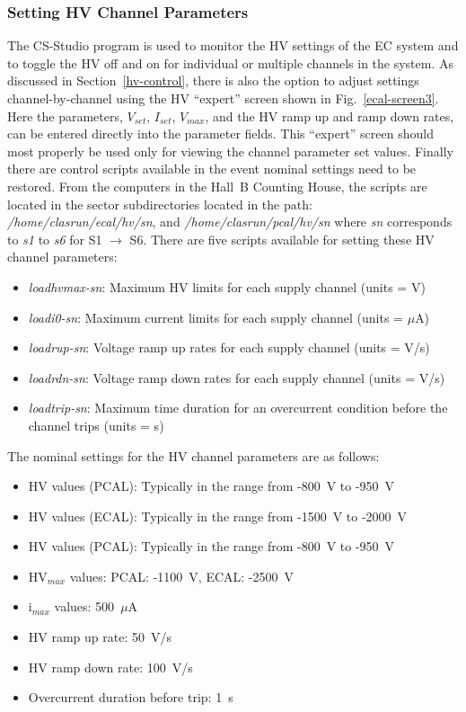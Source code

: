 \documentclass[letterpaper,10pt]{article}
\begin{document}
\subsubsection{Setting HV Channel Parameters}
\label{hv-parms}

The CS-Studio program is used to monitor the HV settings of the EC system and to toggle the HV off
and on for individual or multiple channels in the system.  As discussed in Section~\ref{hv-control}, there is also
the option to adjust settings channel-by-channel using the HV ``expert'' screen shown in
Fig.~\ref{ecal-screen3}. Here the parameters, $V_{set}$, $I_{set}$, $V_{max}$, and the HV ramp up and
ramp down rates, can be entered directly into the parameter fields.  This ``expert'' screen
should most properly be used only for viewing the channel parameter set values. Finally there are control scripts
available in the event nominal settings need to be restored. From the computers in the Hall~B Counting House,
the scripts are located in the sector subdirectories located in the path: {\it /home/clasrun/ecal/hv/sn}, and
{\it /home/clasrun/pcal/hv/sn} where {\it sn} corresponds to {\it s1} to {\it s6} for S1 $\to$ S6.
There are five scripts available for setting these HV channel parameters:

\begin{itemize}
\item {\it loadhvmax-sn}: Maximum HV limits for each supply channel (units = V)
\item {\it loadi0-sn}:    Maximum current limits for each supply channel (units = $\mu$A)
\item {\it loadrup-sn}:   Voltage ramp up rates for each supply channel (units = V/s)
\item {\it loadrdn-sn}:   Voltage ramp down rates for each supply channel (units = V/s)
\item {\it loadtrip-sn}:  Maximum time duration for an overcurrent condition before the 
channel trips (units = s)
\end{itemize}

The nominal settings for the HV channel parameters are as follows:

\begin{itemize}
\item HV values (PCAL): Typically in the range from -800~V to -950~V
\item HV values (ECAL): Typically in the range from -1500~V to -2000~V
\item HV values (PCAL): Typically in the range from -800~V to -950~V
\item HV$_{max}$ values: PCAL: -1100~V, ECAL: -2500~V
\item i$_{max}$ values: 500~$\mu$A
\item HV ramp up rate: 50~V/s
\item HV ramp down rate: 100~V/s
\item Overcurrent duration before trip: 1~s
\end{itemize}
\end{document}
